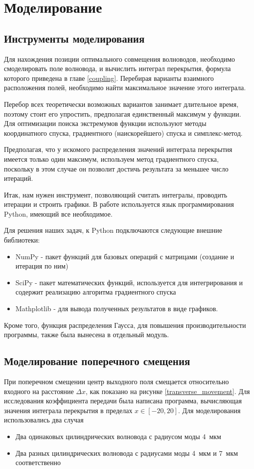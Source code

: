 \chapter{Моделирование}
\section{Инструменты моделирования}
Для нахождения позиции оптимального совмещения волноводов, необходимо смоделировать поле волновода, и вычислить интеграл перекрытия, формула которого приведена в главе \ref{coupling}. Перебирая варианты взаимного расположения полей, необходимо найти максимальное значение этого интеграла.

Перебор всех теоретически возможных вариантов занимает длительное время, поэтому стоит его упростить, предполагая единственный максимум у функции. Для оптимизации поиска экстремумов функции используют методы координатного спуска, градиентного (наискорейшего) спуска и симплекс-метод.\cite{numeric} 

Предполагая, что у искомого распределения значений интеграла перекрытия имеется только один максимум, используем метод градиентного спуска, поскольку в этом случае он позволит достичь результата за меньшее число итераций. \cite{mathews}

Итак, нам нужен инструмент, позволяющий считать интегралы, проводить итерации и строить графики. В работе используется язык программирования Python, имеющий все необходимое. 

Для решения наших задач, к Python подключаются следующие внешние библиотеки:
\begin{itemize}
	\item NumPy - пакет функций для базовых операций с матрицами (создание и итерация по ним)
	\item SciPy - пакет математических функций, используется для интегрирования и содержит реализацию алгоритма градиентного спуска
	\item Mathplotlib - для вывода полученных результатов в виде графиков.
\end{itemize}

Кроме того, функция распределения Гаусса, для повышения производительности программы, также была вынесена в отдельный модуль.

\section{Моделирование поперечного смещения}

При поперечном смещении центр выходного поля смещается относительно входного на расстояние $\Delta x$, как показано на рисунке \ref{transverse_movement}. Для исследования коэффициента передачи была написана программа, вычисляющая значения интеграла перекрытия в пределах $x \in [-20, 20]$.
Для моделирования использовались два случая
\begin{itemize}
	\item Два одинаковых цилиндрических волновода с радиусом моды 4~мкм
	\item Два разных цилиндрических волновода с радиусами моды 4~мкм и 7~мкм соответственно
\end{itemize}

